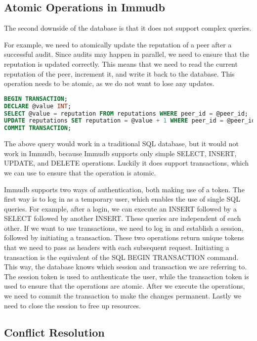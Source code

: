 \subsection{Atomic Operations in Immudb}

The second downside of the database is that it does not support complex queries.

For example, we need to atomically update the reputation of a peer after a successful audit.
Since audits may happen in parallel, we need to ensure that the reputation is updated correctly.
This means that we need to read the current reputation of the peer, increment it, and write it back to the database.
This operation needs to be atomic, as we do not want to lose any updates.

\begin{lstlisting}[language=SQL, caption={SQL query to update the reputation of a peer}, label={lst:sql-query}]
BEGIN TRANSACTION;
DECLARE @value INT;
SELECT @value = reputation FROM reputations WHERE peer_id = @peer_id;
UPDATE reputations SET reputation = @value + 1 WHERE peer_id = @peer_id;
COMMIT TRANSACTION;
\end{lstlisting}

The above query would work in a traditional SQL database, but it would not work in Immudb,
because Immudb supports only simple SELECT, INSERT, UPDATE, and DELETE operations.
Luckily it does support transactions, which we can use to ensure that the operation is atomic.

Immudb supports two ways of authentication, both making use of a token.
The first way is to log in as a temporary user, which enables the use of single SQL queries.
For example, after a login, we can execute an INSERT followed by a SELECT followed by another INSERT.
These queries are independent of each other.
If we want to use transactions, we need to log in and establish a session, followed by initiating a transaction.
These two operations return unique tokens that we need to pass as headers with each subsequent request.
Initiating a transaction is the equivalent of the SQL BEGIN TRANSACTION command.
This way, the database knows which session and transaction we are referring to.
The session token is used to authenticate the user,
while the transaction token is used to ensure that the operations are atomic.
After we execute the operations, we need to commit the transaction to make the changes permanent.
Lastly we need to close the session to free up resources.

\subsection{Conflict Resolution}

